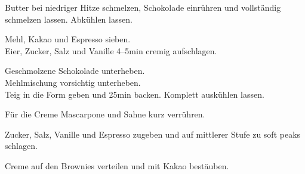 \begin{recipe}
{    \step%
    Butter bei niedriger Hitze schmelzen, Schokolade einrühren und vollständig schmelzen lassen. Abkühlen lassen.
    
    \step%
    Mehl, Kakao und Espresso sieben.\\
    
    \step%
    Eier, Zucker, Salz und Vanille 4--5min cremig aufschlagen.
    
    \step%
    Geschmolzene Schokolade unterheben.\\
    
    \step%
    Mehlmischung vorsichtig unterheben.\\
    
    \step%
    Teig in die Form geben und 25min backen. Komplett auskühlen lassen.
    
    \step%
    Für die Creme Mascarpone und Sahne kurz verrühren.
    
    \step%
    Zucker, Salz, Vanille und Espresso zugeben und auf mittlerer Stufe zu soft peaks schlagen.
    
    \step%
    Creme auf den Brownies verteilen und mit Kakao bestäuben.
}




\end{recipe}